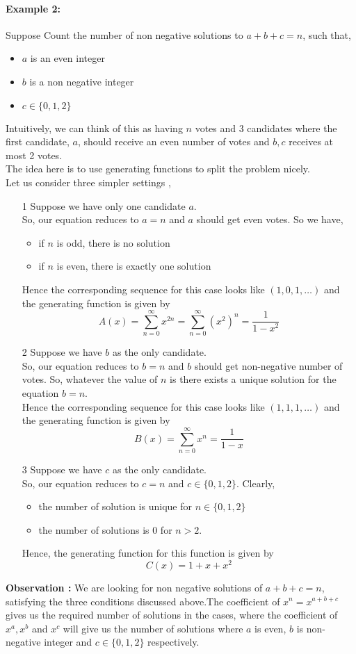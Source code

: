 \paragraph{Example 2:} Suppose  Count the number of non negative solutions to $a+b+c=n$, such that, \begin{itemize}
    \item $a$ is an even integer
\item $b$ is a non negative integer
\item $c\in \{0,1,2\}$
\end{itemize}
Intuitively, we can think of this as having  $n$ votes and 3 candidates where the first candidate, $a$, should receive an even number of votes and $b,c$ receives at 
most 2 votes.\\
The idea here is to use generating functions to split the problem nicely.\\
Let us consider three simpler settings ,
\begin{itemize}
    \item[1] Suppose we have only one candidate $a$.\\ So, our equation reduces to $a=n$ and $a$ should get even votes. So we have, \begin{itemize}
        \item if $n$ is odd, there is no solution
        \item if $n$ is even, there is exactly one solution
    \end{itemize}
    Hence the corresponding sequence for this case looks like $(1,0,1,\dots)$ and the generating function is given by
    $$A(x)=\sum_{n=0}^\infty x^{2n}=\sum_{n=0}^\infty (x^2)^n=\frac{1}{1-x^2}$$
    \item[2] Suppose we have $b$ as the only candidate.\\ So, our equation reduces to $b=n$ and $b$ should get non-negative number of votes. So, whatever the value of $n$ is there exists a unique solution for the equation $b=n$.\\  Hence the corresponding sequence for this case looks like $(1,1,1,\dots)$ and the generating function is given by
    $$B(x)=\sum_{n=0}^\infty x^n=\frac{1}{1-x}$$
    \item[3] Suppose we have $c$ as the only candidate.\\ So, our equation reduces to $c=n$ and $c\in \{0,1,2\}$. Clearly,
    \begin{itemize}
        \item the number of solution is unique for $n \in \{0,1,2\}$
        \item the number of solutions is 0 for $n>2$.
    \end{itemize} Hence, the generating function for this function is given by $$C(x)=1+x+x^2$$
\end{itemize}
\textbf{Observation :} We are looking for non negative solutions of $a+b+c=n$, satisfying the three conditions discussed above.The coefficient of $x^n=x^{a+b+c}$  gives us the required number of solutions in the cases, where the coefficient of $x^a,x^b$ and $x^c$ will give us the number of solutions where $a$ is even, $b$ is non-negative integer and $c\in \{0,1,2\}$ respectively. 

